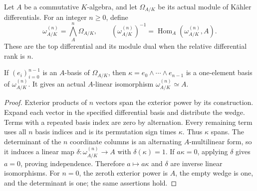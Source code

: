 \begin{definition}
\label{sc0-canonical-port:geom:affine-canonical-module}
\leanok
Let \(A\) be a commutative \(K\)-algebra, and let
\(\Omega_{A/K}\) be its actual module of K\"ahler differentials.
For an integer \(n\geq0\), define
\[
 \omega_{A/K}^{(n)}=\bigwedge_A^n\Omega_{A/K},\qquad
 (\omega_{A/K}^{(n)})^{-1}
   =\operatorname{Hom}_A(\omega_{A/K}^{(n)},A).
\]
These are the top differential and its module dual when the
relative differential rank is \(n\).
\end{definition}

\begin{theorem}
\label{sc0-canonical-port:geom:canonical-frame-from-differential-basis}
\leanok
If \((e_i)_{i=0}^{n-1}\) is an \(A\)-basis of
\(\Omega_{A/K}\), then
\(\kappa=e_0\wedge\cdots\wedge e_{n-1}\) is a one-element
basis of \(\omega_{A/K}^{(n)}\). It gives an actual
\(A\)-linear isomorphism \(\omega_{A/K}^{(n)}\simeq A\).
\end{theorem}
\begin{proof}
Exterior products of \(n\) vectors span the exterior power by its
construction. Expand each vector in the specified differential
basis and distribute the wedge. Terms with a repeated basis index
are zero by alternation. Every remaining term uses all \(n\)
basis indices and is its permutation sign times \(\kappa\).
Thus \(\kappa\) spans.
The determinant of the \(n\) coordinate columns is an alternating
\(A\)-multilinear form, so it induces a linear map
\(\delta:\omega_{A/K}^{(n)}\to A\) with \(\delta(\kappa)=1\).
If \(a\kappa=0\), applying \(\delta\) gives \(a=0\), proving
independence. Therefore \(a\mapsto a\kappa\) and \(\delta\)
are inverse linear isomorphisms. For \(n=0\), the zeroth exterior
power is \(A\), the empty wedge is one, and the determinant is
one; the same assertions hold.
\end{proof}

